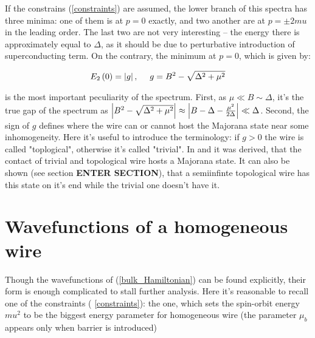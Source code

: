 If the constrains (\ref{constraints}) are assumed, the lower branch of this spectra has three minima: one of them is at $ p=0 $ exactly, and two another are at $ p = \pm 2mu $ in the leading order. The last two are not very interesting -- the energy there is approximately equal to $ \Delta $, as it should be due to perturbative introduction of superconducting term. On the contrary, the minimum at $ p=0 $, which is given by\cite{Oreg_2010}:

\begin{gather}
	E_2\left(0\right)=\left|g\right|,~~~~g = B^2 -\sqrt{\Delta^2+\mu^2}
\end{gather}

is the most important peculiarity of the spectrum. First, as $\mu\ll B \sim \Delta $, it's the true gap of the spectrum as $  \left|B^2 -\sqrt{\Delta^2+\mu^2}\right| \approx  \left|B-\Delta -\frac{\mu^2}{2\Delta}\right|\ll\Delta$. Second, the  sign of  $ g $ defines where the wire can or cannot host the Majorana state near some inhomogeneity. Here it's useful to introduce the terminology: if $ g>0 $ the wire is called "toplogical", otherwise it's called "trivial". In \cite{Oreg_2010} and \cite{Lutchyn_2010} it was derived, that the contact of trivial and topological wire hosts a Majorana state. It can also be shown (see section \textbf{ENTER SECTION}), that a semiinfinte topological wire has this state on it's end while the trivial one doesn't have it.


\section{Wavefunctions of a homogeneous wire}

Though the wavefunctions of (\ref{bulk_Hamiltonian}) can be found explicitly, their form is enough complicated to stall further analysis.  Here it's reasonable  to recall one of the constraints ( \ref{constraints}): the one, which sets the spin-orbit energy $ mu^2 $ to be the biggest energy parameter for homogeneous wire (the parameter $ \mu_b $ appears only when barrier is introduced)
